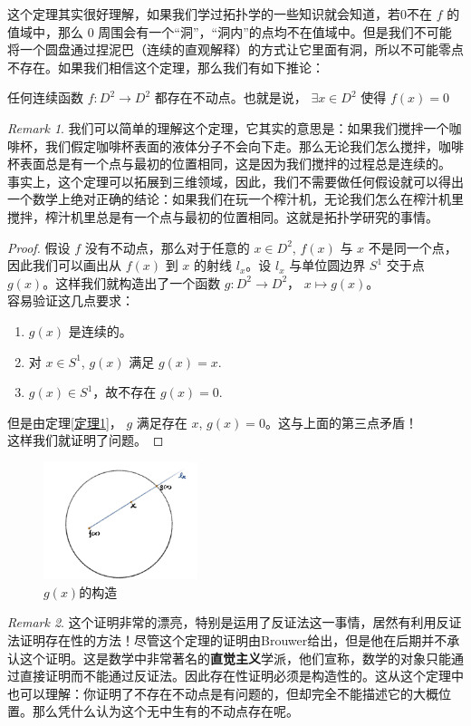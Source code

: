 \documentclass[UTF8,oneside,11pt]{book}
\theoremstyle{plain}\newtheorem{thm}{Theorem}
\theoremstyle{definition}\newtheorem{defn}[thm]{Definition}
\theoremstyle{plain}\newtheorem{axiom}[thm]{Axiom}
\theoremstyle{plain}\newtheorem{coro}[thm]{Corollary}
\theoremstyle{plain}\newtheorem{lemma}[thm]{Lemma}
\theoremstyle{plain}\newtheorem{prop}[thm]{Proposition}
\theoremstyle{plain}\newtheorem{conj}[thm]{Conjecture}
\theoremstyle{plain}\newtheorem{ques}[thm]{Problem}
\theoremstyle{plain}\newtheorem{const}[thm]{Construction}
\theoremstyle{remark}\newtheorem{notation}[thm]{Notation}
\theoremstyle{plain}\newtheorem*{app}{Application}
\theoremstyle{plain}\newtheorem*{exam}{Example}
\theoremstyle{plain}\newtheorem*{exer}{Exercise}
\theoremstyle{remark}\newtheorem*{remark}{Remark}
\theoremstyle{remark}\newtheorem*{note}{\small{Note}}
\numberwithin{equation}{section}
\numberwithin{thm}{section}
\begin{document}
这个定理其实很好理解，如果我们学过拓扑学的一些知识就会知道，若0不在 $ f  $ 的值域中，那么 $ 0 $ 周围会有一个“洞”，“洞内”的点均不在值域中。但是我们不可能将一个圆盘通过捏泥巴（连续的直观解释）的方式让它里面有洞，所以不可能零点不存在。如果我们相信这个定理，那么我们有如下推论：
\begin{theorem}
    任何连续函数 $ f:D^2\rightarrow D^2  $ 都存在不动点。也就是说， $ \exists x\in D^2 $ 使得 $ f(x)=0 $ 
\end{theorem}
\begin{remark}
    我们可以简单的理解这个定理，它其实的意思是：如果我们搅拌一个咖啡杯，我们假定咖啡杯表面的液体分子不会向下走。那么无论我们怎么搅拌，咖啡杯表面总是有一个点与最初的位置相同，这是因为我们搅拌的过程总是连续的。\\
    事实上，这个定理可以拓展到三维领域，因此，我们不需要做任何假设就可以得出一个数学上绝对正确的结论：如果我们在玩一个榨汁机，无论我们怎么在榨汁机里搅拌，榨汁机里总是有一个点与最初的位置相同。这就是拓扑学研究的事情。
\end{remark}
\begin{proof}
    假设 $ f  $ 没有不动点，那么对于任意的 $ x\in D^2 $,  $ f(x)  $ 与 $ x  $ 不是同一个点，因此我们可以画出从 $ f(x) $ 到 $ x  $ 的射线 $ l_x $。设 $ l_x  $ 与单位圆边界 $ S^1 $ 交于点 $ g(x) $。这样我们就构造出了一个函数 $ g:D^2\rightarrow D^2  $， $  x\mapsto g(x) $。\\
    容易验证这几点要求：
    \begin{enumerate}
        \item $ g(x) $ 是连续的。
        \item 对 $ x\in S^1 $, $ g(x) $ 满足 $ g(x)=x $.
        \item  $ g(x)\in S^1 $，故不存在 $ g(x)=0 $.  
    \end{enumerate}  
    但是由定理\ref{定理1}， $ g  $ 满足存在 $ x $,  $ g(x)=0 $。这与上面的第三点矛盾！\\
    这样我们就证明了问题。   
\end{proof}
\begin{figure}[htb]
    \centering
    \includegraphics[width=0.4\textwidth]{Brouwer.jpg}
    \caption{$ g(x) $的构造}
    \label{Brouwer定理}
\end{figure}
\begin{remark}
    这个证明非常的漂亮，特别是运用了反证法这一事情，居然有利用反证法证明存在性的方法！尽管这个定理的证明由Brouwer给出，但是他在后期并不承认这个证明。这是数学中非常著名的\textbf{直觉主义}学派，他们宣称，数学的对象只能通过直接证明而不能通过反证法。因此存在性证明必须是构造性的。这从这个定理中也可以理解：你证明了不存在不动点是有问题的，但却完全不能描述它的大概位置。那么凭什么认为这个无中生有的不动点存在呢。
\end{remark}
\end{document}
